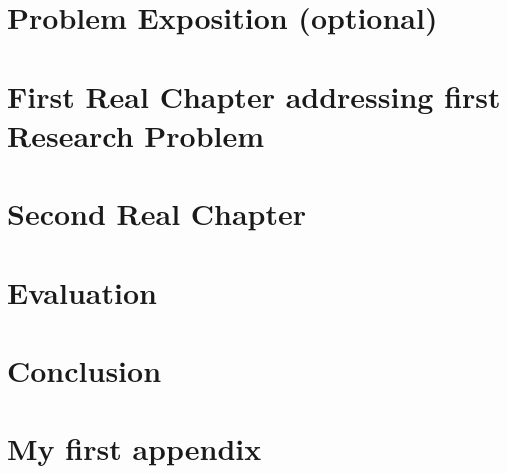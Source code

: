 \documentclass[12pt,a4paper,footinclude=true,twoside,headinclude=true]{report}
\begin{document}
\chapter{Problem Exposition (optional)}\label{sec:problem-exposition}

\chapter{First Real Chapter addressing first Research Problem}\label{sec:problem1}

\chapter{Second Real Chapter}\label{sec:sub-problem2}

\chapter{Evaluation}\label{sec:evaluation}

\chapter{Conclusion}\label{sec:conclusion}






\appendix 
{}

\listoffigures
\listoftables

\chapter{My first appendix}\label{sec:appendix1}
\end{document}
